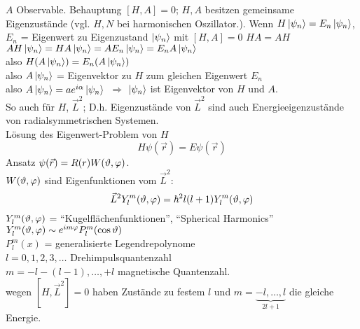 \begin{bemerkung*}
$A$ Observable. Behauptung $[H, A] = 0$; $H, A$ besitzen gemeinsame Eigenzustände (vgl. $H, N$ bei harmonischen Oszillator.).
Wenn $H \ket{\psi_n} = E_n \ket{\psi_n}$, $E_n$ = Eigenwert zu Eigenzustand $\ket{\psi_n}$ mit $[H, A] = 0$ \conseq $HA = AH$\\
\conseq $A H \ket{\psi_n} = H A \ket{\psi_n} = A E_n \ket{\psi_n} = E_n A \ket{\psi_n}$\\
also $H (A \ket{\psi_n}) = E_n (A \ket{\psi_n})$\\
also $A \ket{\psi_n}$ = Eigenvektor zu $H$ zum gleichen Eigenwert $E_n$\\
also $A \ket{\psi_n} = a e^{i \alpha} \ket{\psi_n}$\
$\Rightarrow$ $\ket{\psi_n}$ ist Eigenvektor von $H$ und $A$.\\
So auch für $H$, $\vec{L}^2$; D.h. Eigenzustände von $\vec{L}^2$ sind auch Energieeigenzustände von radialsymmetrischen Systemen.\\
Lösung des Eigenwert-Problem von $H$
$$H \psi(\vec{r}) = E \psi(\vec{r})$$
Ansatz $\psi(\vec{r}) = R(r) W(\vartheta, \varphi)$.\\
$W(\vartheta, \varphi)$ sind Eigenfunktionen vom  $\vec{L}^2$:
$$\vec{L}^2 Y_l^m(\vartheta, \varphi) = \hbar^2 l (l + 1) Y_l^m(\vartheta, \varphi)$$
$Y_l^m(\vartheta, \varphi)$ = "`Kugelflächenfunktionen"', "`Spherical Harmonics"'\\
$Y_l^m(\vartheta, \varphi) \sim e^{im \varphi} P_l^m(\cos \vartheta)$\\
$P_l^m(x)$ = generalisierte Legendrepolynome\\
$l = 0, 1, 2, 3, \dots$ Drehimpulsquantenzahl\\
$m = -l -(l - 1), \dots, +l$ magnetische Quantenzahl.\\
wegen $[H, \vec{L}^2] = 0$ haben Zustände zu festem $l$ und $m = \underbrace{- l, \dots, l}_{2 l + 1}$ die gleiche Energie.
\end{bemerkung*}


